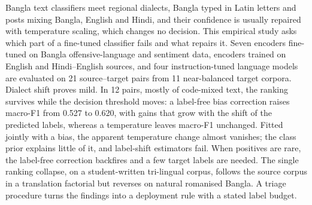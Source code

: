Bangla text classifiers meet regional dialects, Bangla typed in Latin letters and posts mixing Bangla, English and
Hindi, and their confidence is usually repaired with temperature scaling, which changes no decision. This
empirical study asks which part of a fine-tuned classifier fails and what repairs it. Seven encoders
fine-tuned on Bangla offensive-language and sentiment data, encoders trained on English and Hindi--English sources,
and four instruction-tuned language models are evaluated on 21 source--target pairs from 11 near-balanced target
corpora. Dialect shift proves mild. In 12 pairs, mostly of code-mixed text, the ranking survives while the decision
threshold moves: a label-free bias correction raises macro-F1 from 0.527 to 0.620, with gains that grow with the shift of
the predicted labels, whereas a temperature leaves macro-F1 unchanged. Fitted jointly with a
bias, the apparent temperature change almost vanishes; the class prior explains little of it, and
label-shift estimators fail. When positives are rare, the label-free correction backfires and a few
target labels are needed. The single ranking collapse, on a student-written tri-lingual corpus, follows the
source corpus in a translation factorial but reverses on natural romanised Bangla. A triage procedure turns the
findings into a deployment rule with a stated label budget.
